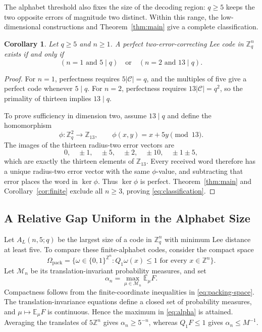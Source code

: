 \documentclass[12pt,letterpaper,onecolumn]{article}
\newtheorem{corollary}[theorem]{Corollary}
\theoremstyle{definition}
\newcommand{\Z}{\mathbb{Z}}
\newcommand{\E}{\mathbb{E}}
\newcommand{\C}{\mathcal{C}}
\newcommand{\card}[1]{\lvert #1\rvert}
\begin{document}
The alphabet threshold also fixes the size of the decoding region: $q\ge5$ keeps the two opposite errors of magnitude two distinct. Within this range, the low-dimensional constructions and Theorem~\ref{thm:main} give a complete classification.

\begin{corollary}\label{cor:classification}
Let $q\ge5$ and $n\ge1$. A perfect two-error-correcting Lee code in $\Z_q^n$ exists if and only if
\begin{equation}\label{eq:classification}
 (n=1\text{ and }5\mid q)\quad\text{or}\quad(n=2\text{ and }13\mid q).
\end{equation}
\end{corollary}
\begin{proof}
For $n=1$, perfectness requires $5\card{\C}=q$, and the multiples of five give a perfect code whenever $5\mid q$. For $n=2$, perfectness requires $13\card{\C}=q^2$, so the primality of thirteen implies $13\mid q$.

To prove sufficiency in dimension two, assume $13\mid q$ and define the homomorphism
\[
 \phi:\Z_q^2\to\Z_{13},\qquad \phi(x,y)=x+5y\pmod{13}.
\]
The images of the thirteen radius-two error vectors are
\[
 0,\quad\pm1,\quad\pm5,\quad\pm2,\quad\pm10,
 \quad\pm1\pm5,
\]
which are exactly the thirteen elements of $\Z_{13}$. Every received word therefore has a unique radius-two error vector with the same $\phi$-value, and subtracting that error places the word in $\ker\phi$. Thus $\ker\phi$ is perfect. Theorem~\ref{thm:main} and Corollary~\ref{cor:finite} exclude all $n\ge3$, proving \eqref{eq:classification}.
\end{proof}

\subsection{A Relative Gap Uniform in the Alphabet Size}
Let $A_L(n,5;q)$ be the largest size of a code in $\Z_q^n$ with minimum Lee distance at least five. To compare these finite-alphabet codes, consider the compact space
\begin{equation}\label{eq:packing-space}
 \Omega_{\mathrm{pack}}=
 \{\omega\in\{0,1\}^{\Z^n}:Q_1\omega(x)\le1\text{ for every }x\in\Z^n\}.
\end{equation}
Let $\mathcal M_n$ be its translation-invariant probability measures, and set
\begin{equation}\label{eq:alpha}
 \alpha_n=\max_{\mu\in\mathcal M_n}\E_\mu F.
\end{equation}
Compactness follows from the finite-coordinate inequalities in \eqref{eq:packing-space}. The translation-invariance equations define a closed set of probability measures, and $\mu\mapsto\E_\mu F$ is continuous. Hence the maximum in \eqref{eq:alpha} is attained. Averaging the translates of $5\Z^n$ gives $\alpha_n\ge5^{-n}$, whereas $Q_1F\le1$ gives $\alpha_n\le M^{-1}$.
\end{document}
